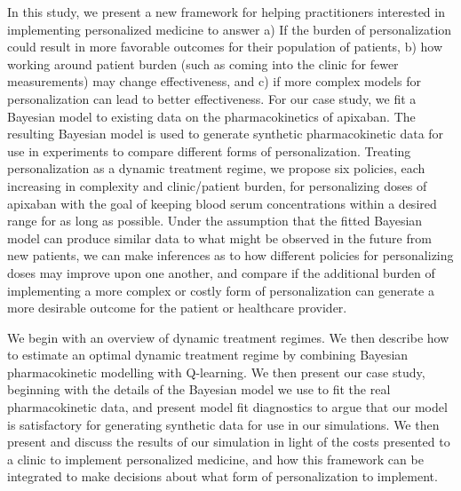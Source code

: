  In this study, we present a new framework for helping practitioners interested in implementing personalized medicine to answer a) If the burden of personalization could result in more favorable outcomes for their population of patients, b) how working around patient burden (such as coming into the clinic for fewer measurements) may change effectiveness, and c) if more complex models for personalization can lead to better effectiveness. For our case study, we fit a Bayesian model to existing data on the pharmacokinetics of apixaban.  The resulting Bayesian model is used to generate synthetic pharmacokinetic data for use in experiments to compare different forms of personalization. Treating personalization as a dynamic treatment regime, we propose six policies, each increasing in complexity and clinic/patient burden, for personalizing doses of apixaban with the goal of keeping blood serum concentrations within a desired range for as long as possible. Under the assumption that the fitted Bayesian model can produce similar data to what might be observed in the future from new patients, we can make inferences as to how different policies for personalizing doses may improve upon one another, and compare if the additional burden of implementing a more complex or costly form of personalization can generate a more desirable outcome for the patient or healthcare provider.  

We begin with an overview of dynamic treatment regimes.  We then describe how to estimate an optimal dynamic treatment regime  by combining Bayesian pharmacokinetic modelling with Q-learning.  We then present our case study, beginning with the details of the Bayesian model we use to fit the real pharmacokinetic data, and present model fit diagnostics to argue that our model is satisfactory for generating synthetic data for use in our simulations. We then present and discuss the results of our simulation in light of the costs presented to a clinic to implement personalized medicine, and how this framework can be integrated to make decisions about what form of personalization to implement.


